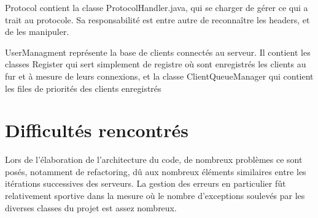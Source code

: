 Protocol contient la classe ProtocolHandler.java, qui se charger de gérer ce qui a trait au protocole. Sa responsabilité est entre autre de reconnaître les headers, et de les manipuler.

UserManagment représente la base de clients connectés au serveur. Il contient les classes Register qui sert simplement de registre où sont enregistrés les clients au fur et à mesure de leurs connexions, et la classe ClientQueueManager qui contient les files de priorités des clients enregistrés

\section{Difficultés rencontrés}

Lors de l'élaboration de l'architecture du code, de nombreux problèmes ce sont posés, notamment de refactoring, dû aux nombreux éléments similaires entre les itérations successives des serveurs.
La gestion des erreurs en particulier fût relativement sportive dans la mesure où le nombre d'exceptions soulevés par les diverses classes du projet est assez nombreux.

